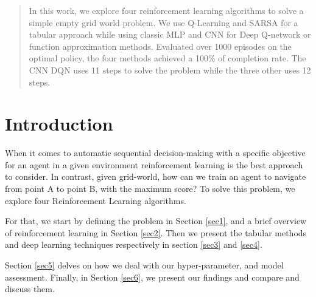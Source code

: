 \newcommand{\bydef}{\overset{\scriptscriptstyle\Delta}{=}}
\newcommand{\EE}{\mathbb{E}}
\newcommand{\PP}{\mathbb{P}}

\begin{abstract}
	In this work, we explore four reinforcement learning algorithms to solve a simple empty grid world problem. We use Q-Learning and SARSA for a tabular approach while using classic MLP and  CNN  for Deep Q-network or function approximation methods. Evaluated over 1000 episodes on the optimal policy, the four methods achieved a 100\% of completion rate. The CNN DQN uses 11 steps to solve the problem while the three other uses 12 steps.
\end{abstract}

\section{Introduction}
When it comes to automatic sequential decision-making with a specific objective for an agent in a given environment reinforcement learning is the best approach to consider. In contrast, given grid-world, how can we train an agent to navigate from point A to point B, with the maximum score? To solve this problem, we explore four Reinforcement Learning algorithms.


For that, we start by defining the problem in Section \ref{sec1}, and a brief overview of reinforcement learning in Section \ref{sec2}. Then we present the tabular methods and deep learning techniques respectively in section \ref{sec3} and \ref{sec4}.

Section \ref{sec5} delves on how we deal with our hyper-parameter, and model assessment. Finally, in Section \ref{sec6}, we present our findings and compare and discuss them.
